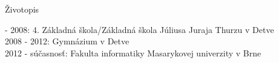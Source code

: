 \documentclass{article}
\begin{document}
\begin{center}
Životopis
\end{center}	
\begin{flushleft}
 - 2008: 4. Základná škola/Základná škola Júliusa Juraja Thurzu v Detve\\
2008 - 2012: Gymnázium v Detve\\
2012 - súčasnosť: Fakulta informatiky Masarykovej univerzity v Brne\\
\end{flushleft}
\end{document}
